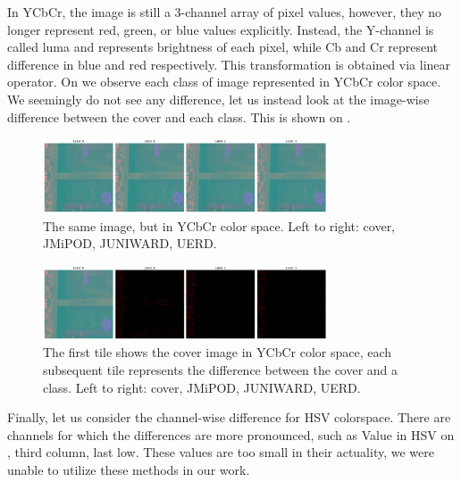 \documentclass[letterpaper]{article}
\begin{document}
In YCbCr, the image is still a 3-channel array of pixel values, however, they no longer represent red, green, or blue values explicitly. Instead, the Y-channel is called luma and represents brightness of each pixel, while Cb and Cr represent difference in blue and red respectively. This transformation is obtained via linear operator. On  we observe each class of image represented in YCbCr color space. We seemingly do not see any difference, let us instead look at the image-wise difference between the cover and each class. This is shown on .

\begin{figure}
    \centering
    \includegraphics[width=0.75\textwidth]{same_image_ycbcr.png}
    \caption{The same image, but in YCbCr color space. Left to right: cover, JMiPOD, JUNIWARD, UERD.}
    \label{ycbcr}
\end{figure}
\begin{figure}
    \centering
    \includegraphics[width=0.75\textwidth]{difference_between_cover_noncover.png}
    \caption{The first tile shows the cover image in YCbCr color space, each subsequent tile represents the difference between the cover and a class. Left to right: cover, JMiPOD, JUNIWARD, UERD.}
    \label{ycbcr-difference}
\end{figure}

Finally, let us consider the channel-wise difference for HSV colorspace. There are channels for which the differences are more pronounced, such as Value in HSV on , third column, last low. These values are too small in their actuality, we were unable to utilize these methods in our work.
\end{document}

